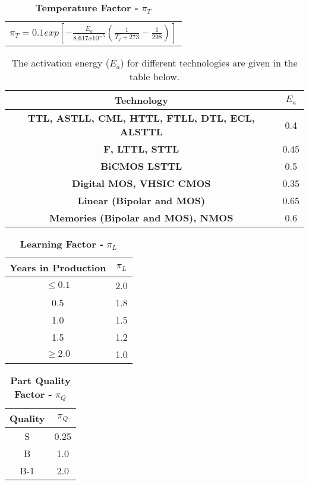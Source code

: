 \begin{table}[h]
\caption{\textbf{Temperature Factor -} $\pi_{T}$}
\label{table:tempFactorIc}
\begin{tabular}{l} 
$\pi_{T} = 0.1 exp[-\frac{E_{a}}{8.617x10^{-5}} (\frac{1}{T_j + 273} - \frac{1}{298})]$ \\
\end{tabular}
\end{table}

\begin{table}[h]
\caption{ The activation energy ($E_{a}$) for different technologies are given in the table below.}
\label{activationEnergyIc}
\begin{tabular}{|c|c|} \hline
\rowcolor{Gray}
\textbf{Technology}& $E_{a}$ \\ \hline
\textbf{TTL, ASTLL, CML, HTTL, FTLL, DTL, ECL, ALSTTL} & 0.4 \\ \hline
\textbf{F, LTTL, STTL} & 0.45 \\ \hline
\textbf{BiCMOS LSTTL} & 0.5 \\ \hline
\textbf{Digital MOS, VHSIC CMOS} & 0.35 \\ \hline
\textbf{Linear (Bipolar and MOS)}&  0.65 \\ \hline
\textbf{Memories (Bipolar and MOS), NMOS}  & 0.6 \\ \hline
\end{tabular}
\end{table}

\begin{table}[h]
\caption{\textbf{Learning Factor -} $\pi_{L}$}
\label{table:learningFactorIc}
\begin{tabular}{|c|c|} \hline
\rowcolor{Gray}
\textbf{Years in Production} & $\pi_{L}$ \\ \hline
$\leq 0.1$ & 2.0 \\ \hline
0.5 & 1.8 \\ \hline
1.0 & 1.5 \\ \hline
1.5 & 1.2 \\ \hline
$\geq 2.0$ & 1.0 \\ \hline
\end{tabular}
\end{table}


\begin{table}[h]
\caption{\textbf{Part Quality  Factor -} $\pi_{Q}$}
\label{table:partQualityFactorIc}
\begin{tabular}{|c|c|} \hline
\rowcolor{Gray}
\textbf{Quality} & $\pi_{Q}$ \\ \hline
S & 0.25 \\ \hline
B & 1.0 \\ \hline
B-1 & 2.0 \\ \hline
\end{tabular}
\end{table}


